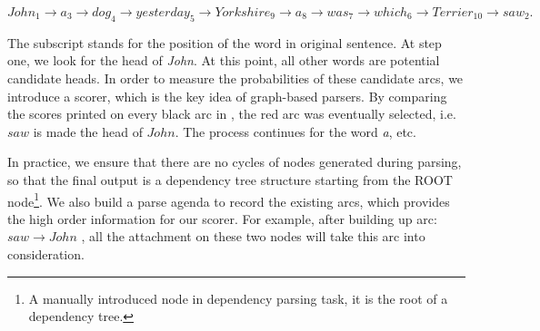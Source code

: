 \noindent
$John_{1}\rightarrow a_{3}\rightarrow dog_{4}\rightarrow yesterday_{5}\rightarrow Yorkshire_{9}\rightarrow a_{8}\rightarrow was_{7}\rightarrow which_{6}\rightarrow Terrier_{10}\rightarrow saw_{2}.$

The subscript stands for the position of the word in original sentence.
At step one, we look for the head of \textit{John}. At this point, 
all other words are potential candidate heads. In order to measure
the probabilities of these candidate arcs, we introduce a scorer, which
is the key idea of graph-based parsers. By comparing the scores
printed on every black arc in ,
the red arc was eventually selected, i.e. $saw$ is made the head
of $John$. The process continues for the word \textit{a}, etc.

In practice, we 
ensure that
there are no cycles of nodes generated during parsing, so that the final output
is a dependency tree structure starting from
the ROOT node\footnote{A manually introduced node in dependency parsing task,
it is the root of a dependency tree.}.
We also build a parse agenda to record the existing arcs, which
provides the high order information for our scorer.
For example, after building up arc:$saw \rightarrow John$ , all
the attachment on these two nodes will take this arc into consideration.
